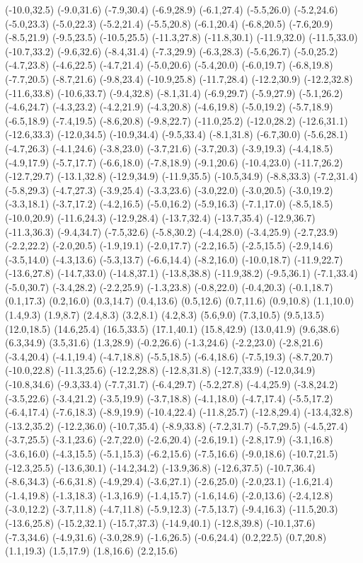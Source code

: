 (-10.0,32.5) (-9.0,31.6) (-7.9,30.4) (-6.9,28.9) (-6.1,27.4) (-5.5,26.0) (-5.2,24.6) (-5.0,23.3) (-5.0,22.3) (-5.2,21.4) (-5.5,20.8) (-6.1,20.4) (-6.8,20.5) (-7.6,20.9) (-8.5,21.9) (-9.5,23.5) (-10.5,25.5) (-11.3,27.8) (-11.8,30.1) (-11.9,32.0) (-11.5,33.0) (-10.7,33.2) (-9.6,32.6) (-8.4,31.4) (-7.3,29.9) (-6.3,28.3) (-5.6,26.7) (-5.0,25.2) (-4.7,23.8) (-4.6,22.5) (-4.7,21.4) (-5.0,20.6) (-5.4,20.0) (-6.0,19.7) (-6.8,19.8) (-7.7,20.5) (-8.7,21.6) (-9.8,23.4) (-10.9,25.8) (-11.7,28.4) (-12.2,30.9) (-12.2,32.8) (-11.6,33.8) (-10.6,33.7) (-9.4,32.8) (-8.1,31.4) (-6.9,29.7) (-5.9,27.9) (-5.1,26.2) (-4.6,24.7) (-4.3,23.2) (-4.2,21.9) (-4.3,20.8) (-4.6,19.8) (-5.0,19.2) (-5.7,18.9) (-6.5,18.9) (-7.4,19.5) (-8.6,20.8) (-9.8,22.7) (-11.0,25.2) (-12.0,28.2) (-12.6,31.1) (-12.6,33.3) (-12.0,34.5) (-10.9,34.4) (-9.5,33.4) (-8.1,31.8) (-6.7,30.0) (-5.6,28.1) (-4.7,26.3) (-4.1,24.6) (-3.8,23.0) (-3.7,21.6) (-3.7,20.3) (-3.9,19.3) (-4.4,18.5) (-4.9,17.9) (-5.7,17.7) (-6.6,18.0) (-7.8,18.9) (-9.1,20.6) (-10.4,23.0) (-11.7,26.2) (-12.7,29.7) (-13.1,32.8) (-12.9,34.9) (-11.9,35.5) (-10.5,34.9) (-8.8,33.3) (-7.2,31.4) (-5.8,29.3) (-4.7,27.3) (-3.9,25.4) (-3.3,23.6) (-3.0,22.0) (-3.0,20.5) (-3.0,19.2) (-3.3,18.1) (-3.7,17.2) (-4.2,16.5) (-5.0,16.2) (-5.9,16.3) (-7.1,17.0) (-8.5,18.5) (-10.0,20.9) (-11.6,24.3) (-12.9,28.4) (-13.7,32.4) (-13.7,35.4) (-12.9,36.7) (-11.3,36.3) (-9.4,34.7) (-7.5,32.6) (-5.8,30.2) (-4.4,28.0) (-3.4,25.9) (-2.7,23.9) (-2.2,22.2) (-2.0,20.5) (-1.9,19.1) (-2.0,17.7) (-2.2,16.5) (-2.5,15.5) (-2.9,14.6) (-3.5,14.0) (-4.3,13.6) (-5.3,13.7) (-6.6,14.4) (-8.2,16.0) (-10.0,18.7) (-11.9,22.7) (-13.6,27.8) (-14.7,33.0) (-14.8,37.1) (-13.8,38.8) (-11.9,38.2) (-9.5,36.1) (-7.1,33.4) (-5.0,30.7) (-3.4,28.2) (-2.2,25.9) (-1.3,23.8) (-0.8,22.0) (-0.4,20.3) (-0.1,18.7) (0.1,17.3) (0.2,16.0) (0.3,14.7) (0.4,13.6) (0.5,12.6) (0.7,11.6) (0.9,10.8) (1.1,10.0) (1.4,9.3) (1.9,8.7) (2.4,8.3) (3.2,8.1) (4.2,8.3) (5.6,9.0) (7.3,10.5) (9.5,13.5) (12.0,18.5) (14.6,25.4) (16.5,33.5) (17.1,40.1) (15.8,42.9) (13.0,41.9) (9.6,38.6) (6.3,34.9) (3.5,31.6) (1.3,28.9) (-0.2,26.6) (-1.3,24.6) (-2.2,23.0) (-2.8,21.6) (-3.4,20.4) (-4.1,19.4) (-4.7,18.8) (-5.5,18.5) (-6.4,18.6) (-7.5,19.3) (-8.7,20.7) (-10.0,22.8) (-11.3,25.6) (-12.2,28.8) (-12.8,31.8) (-12.7,33.9) (-12.0,34.9) (-10.8,34.6) (-9.3,33.4) (-7.7,31.7) (-6.4,29.7) (-5.2,27.8) (-4.4,25.9) (-3.8,24.2) (-3.5,22.6) (-3.4,21.2) (-3.5,19.9) (-3.7,18.8) (-4.1,18.0) (-4.7,17.4) (-5.5,17.2) (-6.4,17.4) (-7.6,18.3) (-8.9,19.9) (-10.4,22.4) (-11.8,25.7) (-12.8,29.4) (-13.4,32.8) (-13.2,35.2) (-12.2,36.0) (-10.7,35.4) (-8.9,33.8) (-7.2,31.7) (-5.7,29.5) (-4.5,27.4) (-3.7,25.5) (-3.1,23.6) (-2.7,22.0) (-2.6,20.4) (-2.6,19.1) (-2.8,17.9) (-3.1,16.8) (-3.6,16.0) (-4.3,15.5) (-5.1,15.3) (-6.2,15.6) (-7.5,16.6) (-9.0,18.6) (-10.7,21.5) (-12.3,25.5) (-13.6,30.1) (-14.2,34.2) (-13.9,36.8) (-12.6,37.5) (-10.7,36.4) (-8.6,34.3) (-6.6,31.8) (-4.9,29.4) (-3.6,27.1) (-2.6,25.0) (-2.0,23.1) (-1.6,21.4) (-1.4,19.8) (-1.3,18.3) (-1.3,16.9) (-1.4,15.7) (-1.6,14.6) (-2.0,13.6) (-2.4,12.8) (-3.0,12.2) (-3.7,11.8) (-4.7,11.8) (-5.9,12.3) (-7.5,13.7) (-9.4,16.3) (-11.5,20.3) (-13.6,25.8) (-15.2,32.1) (-15.7,37.3) (-14.9,40.1) (-12.8,39.8) (-10.1,37.6) (-7.3,34.6) (-4.9,31.6) (-3.0,28.9) (-1.6,26.5) (-0.6,24.4) (0.2,22.5) (0.7,20.8) (1.1,19.3) (1.5,17.9) (1.8,16.6) (2.2,15.6) 